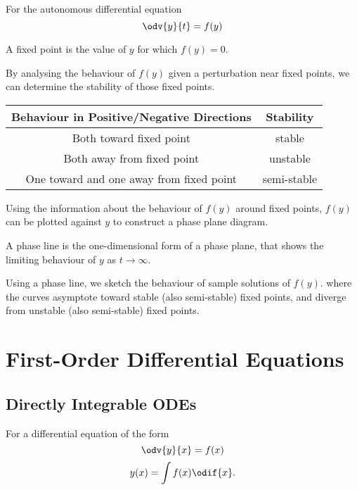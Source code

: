 \documentclass{article}
\begin{document}
For the autonomous differential equation
\begin{equation*}
    \odv{y}{t} = f(y)
\end{equation*}
\begin{definition}
    A fixed point is the value of \(y\) for which \(f(y) = 0\).
\end{definition}
\begin{definition}[Stability]
    By analysing the behaviour of \(f(y)\) given a perturbation near fixed points,
    we can determine the stability of those fixed points.
    \begin{table}[H]
        \centering
        \begin{tabular}{c c}
            \toprule
            \textbf{Behaviour in Positive/Negative Directions} & \textbf{Stability} \\
            \midrule
            Both toward fixed point                            & stable             \\
            Both away from fixed point                         & unstable           \\
            One toward and one away from fixed point           & semi-stable        \\
            \bottomrule
        \end{tabular}
    \end{table}
\end{definition}
\begin{definition}
    Using the information about the behaviour of \(f(y)\) around fixed points, \(f(y)\) can be plotted against \(y\)
    to construct a phase plane diagram.
\end{definition}
\begin{definition}
    A phase line is the one-dimensional form of a phase plane,
    that shows the limiting behaviour of \(y\) as \(t \to \infty\).
\end{definition}
\begin{definition}
    Using a phase line, we sketch the behaviour of sample solutions of \(f(y)\).
    where the curves asymptote toward stable
    (also semi-stable) fixed points, and diverge from unstable (also semi-stable) fixed points.
\end{definition}
\newpage
\section{First-Order Differential Equations}
\subsection{Directly Integrable ODEs}
For a differential equation of the form
\begin{equation*}
    \odv{y}{x} = f(x)
\end{equation*}
\begin{equation*}
    y(x) = \int f(x) \odif{x}.
\end{equation*}
\end{document}
